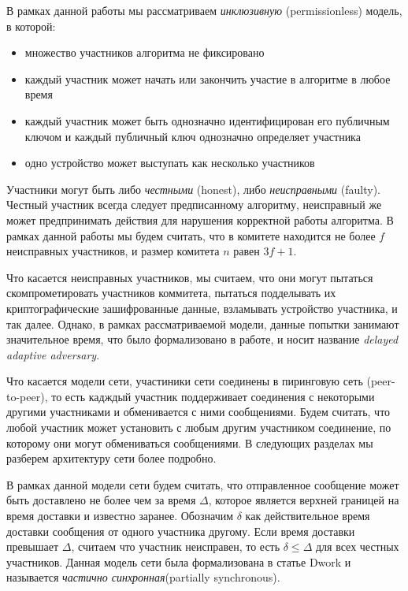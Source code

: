 В рамках данной работы мы рассматриваем \textit{инклюзивную} (permissionless) модель, в которой:
\begin{itemize}
\item множество участников алгоритма не фиксировано
\item каждый участник может начать или закончить участие в алгоритме в любое время
\item каждый участник может быть однозначно идентифицирован его публичным ключом и каждый публичный ключ однозначно определяет участника
\item одно устройство может выступать как несколько участников
\end{itemize}

Участники могут быть либо \textit{честными} (honest), либо \textit{неисправными} (faulty).  Честный участник всегда следует предписанному алгоритму, неисправный же может предпринимать действия для нарушения корректной работы алгоритма.
В рамках данной работы мы будем считать, что в комитете находится не более $f$ неисправных участников, и размер комитета $n$ равен $3f+1$.

Что касается неисправных участников, мы считаем, что они могут пытаться скомпрометировать участников коммитета, пытаться подделывать их криптографические зашифрованные данные, взламывать устройство участника, и так далее. Однако, в рамках рассматриваемой модели, данные попытки занимают значительное время, что было формализовано в работе\cite{hybrid-consensus}, и носит название \textit{delayed adaptive adversary}.

Что касается модели сети, участиники сети соединены в пиринговую сеть (peer-to-peer), 
то есть кадждый участник поддерживает соединения с некоторыми другими участниками и обменивается с ними сообщениями. Будем считать, что любой участник может установить с любым другим участником соединение, по которому они могут обмениваться сообщениями. В следующих разделах мы разберем архитектуру сети более подробно.

В рамках данной модели сети будем считать, что отправленное сообщение может быть доставлено не более чем за время $\Delta$, которое является верхней границей на время доставки и известно заранее.
Обозначим $\delta$ как действительное время доставки сообщения от одного участника другому. 
Если время доставки превышает $\Delta$, считаем что участник неисправен, 
то есть $\delta \le \Delta$ для всех честных участников. 
Данная модель сети была формализована в статье Dwork \cite{Dwork:1988:CPP:42282.42283} и называется \textit{частично синхронная}(partially synchronous).

